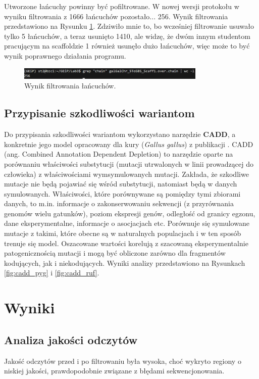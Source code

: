 \documentclass[a4paper, 12pt]{article}
\begin{document}
Utworzone łańcuchy powinny być pofiltrowane. W nowej wersji protokołu w wyniku filtrowania z 1666 łańcuchów pozostało... 256. Wynik filtrowania przedstawiono na Rysunku \ref{fig:filtered_chains}. Zdziwiło mnie to, bo wcześniej filtrowanie usuwało tylko 5 łańcuchów, a teraz usunięto 1410, ale widzę, że dwóm innym studentom pracującym na scaffoldzie 1 również usunęło dużo łańcuchów, więc może to być wynik poprawnego działania programu.

\begin{figure}[H]
    \centering
    \includegraphics[width=0.8\textwidth]{img/maybe_erronously_filtered.png}
    \caption{Wynik filtrowania łańcuchów.}
    \label{fig:filtered_chains}
\end{figure}

\subsection{Przypisanie szkodliwości wariantom}
Do przypisania szkodliwości wariantom wykorzystano narzędzie \textbf{CADD}, a konkretnie jego model opracowany dla kury (\textit{Gallus gallus}) z publikacji \cite{Gro2020}. CADD (ang. Combined Annotation Dependent Depletion) to narzędzie oparte na porównaniu właściwości substytucji (mutacji utrwalonych w linii prowadzącej do człowieka) z właściwościami wymsymulowanych mutacji. Zakłada, że szkodliwe mutacje nie będą pojawiać się wśród substytucji, natomiast będą w danych symulowanych. Właściwości, które porównywane są pomiędzy tymi zbiorami danych, to m.in. informacje o zakonserwowaniu sekwencji (z przyrównania genomów wielu gatunków), poziom ekspresji genów, odległość od granicy egzonu, dane eksperymentalne, informacje o asocjacjach etc. Porównuje się symulowane mutacje z takimi, które obecne są w naturalnych populacjach i w ten sposób trenuje się model. Oszacowane wartości korelują z szacowaną eksperymentalnie patogenicznością mutacji i mogą być obliczone zarówno dla fragmentów kodujących, jak i niekodujących. Wyniki analizy przedstawiono na Rysunkach \ref{fig:cadd_pyg} i \ref{fig:cadd_ruf}.

\section{Wyniki}
\subsection{Analiza jakości odczytów}
Jakość odczytów przed i po filtrowaniu była wysoka, choć wykryto regiony o niskiej jakości, prawdopodobnie związane z błędami sekwencjonowania.
\end{document}
